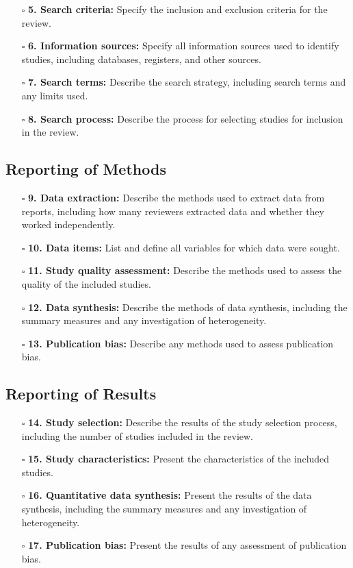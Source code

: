 \documentclass[11pt]{article}
\def\tightlist{}
\begin{document}
\begin{Form}
\begin{itemize}
\tightlist
\item[$\square$]
  \textbf{5. Search criteria:} Specify the inclusion and exclusion
  criteria for the review.
\item[$\square$]
  \textbf{6. Information sources:} Specify all information sources used
  to identify studies, including databases, registers, and other
  sources.
\item[$\square$]
  \textbf{7. Search terms:} Describe the search strategy, including
  search terms and any limits used.
\item[$\square$]
  \textbf{8. Search process:} Describe the process for selecting studies
  for inclusion in the review.
\end{itemize}

\subsection{Reporting of Methods}\label{reporting-of-methods}

\begin{itemize}
\tightlist
\item[$\square$]
  \textbf{9. Data extraction:} Describe the methods used to extract data
  from reports, including how many reviewers extracted data and whether
  they worked independently.
\item[$\square$]
  \textbf{10. Data items:} List and define all variables for which data
  were sought.
\item[$\square$]
  \textbf{11. Study quality assessment:} Describe the methods used to
  assess the quality of the included studies.
\item[$\square$]
  \textbf{12. Data synthesis:} Describe the methods of data synthesis,
  including the summary measures and any investigation of heterogeneity.
\item[$\square$]
  \textbf{13. Publication bias:} Describe any methods used to assess
  publication bias.
\end{itemize}

\subsection{Reporting of Results}\label{reporting-of-results}

\begin{itemize}
\tightlist
\item[$\square$]
  \textbf{14. Study selection:} Describe the results of the study
  selection process, including the number of studies included in the
  review.
\item[$\square$]
  \textbf{15. Study characteristics:} Present the characteristics of the
  included studies.
\item[$\square$]
  \textbf{16. Quantitative data synthesis:} Present the results of the
  data synthesis, including the summary measures and any investigation
  of heterogeneity.
\item[$\square$]
  \textbf{17. Publication bias:} Present the results of any assessment
  of publication bias.
\end{itemize}


\end{Form}
\end{document}
